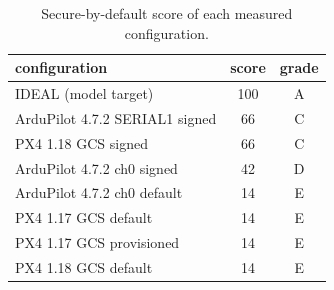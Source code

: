 \begin{table}[t]
\caption{Secure-by-default score of each measured configuration.}
\label{tab:scores}
\centering\footnotesize
\begin{tabular}{@{}lcc@{}}
\toprule
configuration & score & grade \\
\midrule
IDEAL (model target) & 100 & A \\
ArduPilot 4.7.2 SERIAL1 signed & 66 & C \\
PX4 1.18 GCS signed & 66 & C \\
ArduPilot 4.7.2 ch0 signed & 42 & D \\
ArduPilot 4.7.2 ch0 default & 14 & E \\
PX4 1.17 GCS default & 14 & E \\
PX4 1.17 GCS provisioned & 14 & E \\
PX4 1.18 GCS default & 14 & E \\
\bottomrule
\end{tabular}
\end{table}
